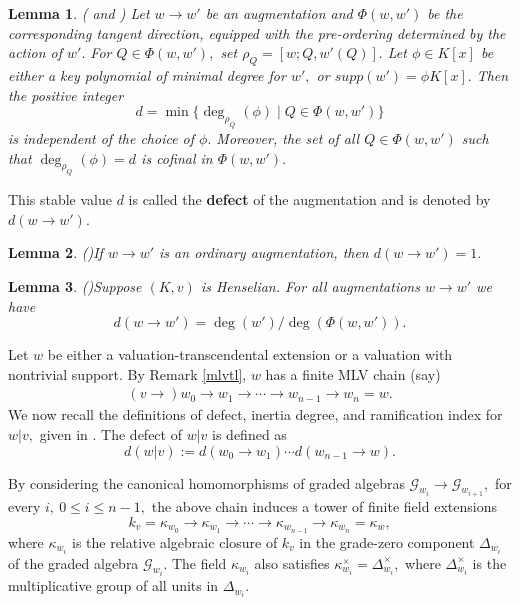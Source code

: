 \documentclass[11pt]{amsart}
\newtheorem{theorem}{Theorem}[section]
\newtheorem{lemma}[theorem]{Lemma}
\theoremstyle{definition}
\theoremstyle{remark}
\numberwithin{equation}{section}
\begin{document}
	\begin{lemma}(\cite{V0} and \cite[Lemma 6.1]{EN3})
	Let $w\longrightarrow w'$ be an augmentation and $\Phi(w,w')$ be the corresponding tangent direction, equipped with the pre-ordering determined by the action of $w'.$ For $Q\in\Phi(w,w') ,$ set $\rho_Q=[w;Q, w'(Q)].$ Let $\phi \in K[x]$ be either a key polynomial of minimal degree for $w',$ or $supp(w')=\phi K[x].$ Then the positive integer \[d=\min\{\deg_{\rho_Q}(\phi) \mid Q\in \Phi(w,w')\}\] is independent of the choice of $\phi.$ Moreover, the set of all $Q\in \Phi(w,w')$ such that $\deg_{\rho_Q}(\phi)=d$ is cofinal in $\Phi(w,w').$
	\end{lemma}
	This stable value $d$ is called the {\bf defect} of the augmentation and is denoted by $d(w\longrightarrow w').$
	
	\begin{lemma}(\cite[Lemma 6.3]{EN3})\label{nl1}
	If $w\longrightarrow w'$ is an ordinary augmentation, then $d(w\longrightarrow w')=1.$
	\end{lemma}
	\begin{lemma}(\cite[Lemma 6.4]{EN3})\label{nl2}
	Suppose $(K,v)$ is Henselian. For all augmentations $w\longrightarrow w'$ we have
	\[d(w\longrightarrow w')=\deg(w')/ \deg ({\Phi(w,w')}).\]
	\end{lemma}
	


	Let $w$ be either a valuation-transcendental extension or a valuation with nontrivial support. By Remark \ref{mlvtl}, $w$ has a finite MLV chain (say)
	\begin{align}\label{ed1}
			(v \longrightarrow) w_0  \longrightarrow w_1  \longrightarrow \cdots  \longrightarrow w_{n-1}  \longrightarrow w_n=w .
			\end{align}
			We now recall the definitions of defect, inertia degree, and ramification index for $w|v,$ given in \cite{EN3}.
			The defect of $w|v$ is defined as
			\[d(w|v):=d(w_0\longrightarrow w_1) \cdots d(w_{n-1}\longrightarrow w).\]
		
	 By considering the canonical homomorphisms of graded algebras $\mathcal{G}_{w_i} \longrightarrow \mathcal{G}_{w_{i+1}},$ for every $i,\ 0\leq i\leq n-1,$ the above chain induces a tower of finite field extensions 
	\[k_v=\kappa_{w_0}\longrightarrow\kappa_{w_1}\longrightarrow\cdots\longrightarrow \kappa_{w_{n-1}} \longrightarrow \kappa_{w_n}=\kappa_w,\]
		where $\kappa_{w_i}$ is the relative algebraic closure of $k_v$ in the grade-zero component $\Delta_{w_i}$ of the graded algebra $\mathcal{G}_{w_i}.$ The field $\kappa_{w_i}$ also satisfies $\kappa_{w_i}^\times=\Delta_{w_i}^\times,$ where $\Delta_{w_i}^\times$ is the multiplicative group of all units in $\Delta_{w_i}.$
	
\end{document}
